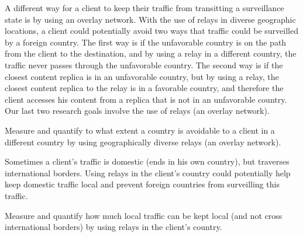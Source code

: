 A different way for a client to keep their traffic from transitting a surveillance state is by using an overlay network.  With the use of relays in diverse geographic locations, a client could potentially avoid two ways that traffic could be surveilled by a foreign country.  The first way is if the unfavorable country is on the path from the client to the destination, and by using a relay in a different country, the traffic never passes through the unfavorable country.  The second way is if the closest content replica is in an unfavorable country, but by using a relay, the closest content replica to the relay is in a favorable country, and therefore the client accesses his content from a replica that is not in an unfavorable country.  Our last two research goals involve the use of relays (an overlay network).

\begin{thm}
Measure and quantify to what extent a country is avoidable to a client in a different country by using geographically diverse relays (an overlay network).
\end{thm}

Sometimes a client's traffic is domestic (ends in his own country), but traverses international borders.  Using relays in the client's country could potentially help keep domestic traffic local and prevent foreign countries from surveilling this traffic.

\begin{thm}
Measure and quantify how much local traffic can be kept local (and not cross international borders) by using relays in the client's country.
\end{thm}
